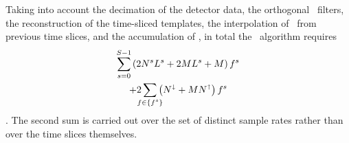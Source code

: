 Taking into account the decimation of the detector data, the orthogonal \fir\ filters, the reconstruction of the time-sliced templates, the interpolation of \SNR\ from previous time slices, and the accumulation of \SNR, in total the \lloid\ algorithm requires
\begin{multline*}
\sum_{\mathclap{s=0}}^{\mathclap{S-1}} \left( 2 \slicessamps \numsvdtmps + 2 \numtmps \numsvdtmps + \numtmps \right) f^s \\ + 2\sum_{\mathclap{f \in \{f^s\}}} \left( N^\shortdownarrow + \numtmps N^\shortuparrow \right) f^s
\end{multline*}
\flops.  The second sum is carried out over the set of distinct sample rates rather than over the time slices themselves.

